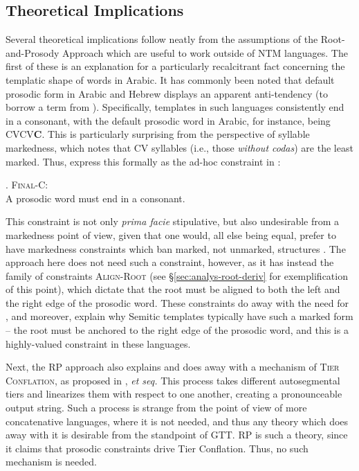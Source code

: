 \documentclass[12pt,twoside,letterpaper]{article}
\begin{document}
\subsection{Theoretical Implications}
\label{sec:theor-impl}

Several theoretical implications follow neatly from the assumptions of the Root-and-Prosody Approach which are useful to work outside of NTM languages. The first of these is an explanation for a particularly recalcitrant fact concerning the templatic shape of words in Arabic. It has commonly been noted that default prosodic form in Arabic and Hebrew displays an apparent anti-tendency (to borrow a term from \cite{clements97}). Specifically, templates in such languages consistently end in a consonant, with the default prosodic word in Arabic, for instance, being CVCV\textbf{C}. This is particularly surprising from the perspective of syllable markedness, which notes that CV syllables (i.e., those \emph{without codas}) are the least marked. Thus, \cite{mccarthy94} express this formally as the ad-hoc constraint in \Next:

\ex. \textsc{Final-C}:\\A prosodic word must end in a consonant.

This constraint is not only \emph{prima facie} stipulative, but also undesirable from a markedness point of view, given that one would, all else being equal, prefer to have markedness constraints which ban marked, not unmarked, structures \citep{clements97}. The approach here does not need such a constraint, however, as it has instead the family of constraints \textsc{Align-Root} (see \S{\ref{sec:analys-root-deriv}} for exemplification of this point), which dictate that the root must be aligned to both the left and the right edge of the prosodic word. These constraints do away with the need for \Last, and moreover, explain why Semitic templates typically have such a marked form -- the root must be anchored to the right edge of the prosodic word, and this is a highly-valued constraint in these languages.

Next, the RP approach also explains and does away with a mechanism of \textsc{Tier Conflation}, as proposed in \cite{mccarthy81}, \emph{et seq.} This process takes different autosegmental tiers and linearizes them with respect to one another, creating a pronounceable output string. Such a process is strange from the point of view of more concatenative languages, where it is not needed, and thus any theory which does away with it is desirable from the standpoint of GTT. RP is such a theory, since it claims that prosodic constraints drive Tier Conflation. Thus, no such mechanism is needed.
\end{document}
